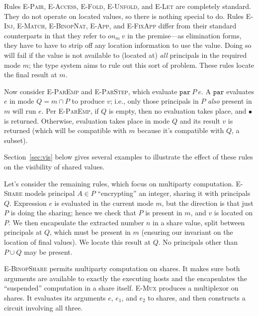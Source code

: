 \documentclass[10pt]{article}
\newcommand{\rulelab}[1]{{\small \textsc{#1}}}
\newcommand{\kw}[1]{\ensuremath{\mathtt{#1}}}
\newcommand{\epar}[2]{\ensuremath{\kw{par}~{#1}~{#2}}}
\newcommand{\vcrash}{\ensuremath{\bullet}}
\newcommand{\getat}[2]{\ensuremath{\mathit{on}_{#1}~{#2}}}
\begin{document}
Rules \rulelab{E-Pair}, \rulelab{E-Access}, \rulelab{E-Fold},
\rulelab{E-Unfold}, and \rulelab{E-Let} are completely standard. They
do not operate on located values, so there is nothing special to do.
Rules \rulelab{E-Inj}, \rulelab{E-Match}, \rulelab{E-BinopNat},
\rulelab{E-App}, and \rulelab{E-FixApp} differ from their standard
counterparts in that they refer to $\getat{m}{v}$ in the premise---as
elimination forms, they have to have to strip off any location
information to use the value. Doing so will fail if the value is
not available to (located at) \emph{all} principals in the required
mode $m$; the type system aims to rule out this sort of problem. These
rules locate the final result at $m$.

Now consider \rulelab{E-ParEmp} and \rulelab{E-ParStep}, which
evaluate $\epar{P}{e}$. A $\kw{par}$ evaluates $e$ in mode
$Q = m \cap P$ to produce $v$; i.e., only those principals in $P$
\emph{also} present in $m$ will run $e$. Per \rulelab{E-ParEmp}, if
$Q$ is empty, then no evaluation takes place, and $\vcrash$ is
returned. %
Otherwise, evaluation
takes place in mode $Q$ and its result $v$ is returned (which will be
compatible with $m$ because it's compatible with $Q$, a subset).

Section~\ref{sec:vis} below gives several examples to illustrate the
effect of these rules on the visibility of shared values.

Let's consider the remaining rules, which focus on multiparty
computation. \rulelab{E-Share} models principal $A \in P$
``encrypting'' an integer, sharing it with principals $Q$. Expression
$e$ is evaluated in the current mode $m$, but the direction is that
just $P$ is doing the sharing; hence we check that $P$ is present in
$m$, and $v$ is located
on $P$. We then encapsulate the extracted number $n$ in a share value,
split between principals at $Q$, which must be present in $m$
(ensuring our invariant on the location of final values). We locate
this result at $Q$. No principals other than $P \cup Q$ may be
present. 

\rulelab{E-BinopShare} permits multiparty computation on shares. It
makes sure both arguments are available to exactly the executing hosts
and the encapsulates the ``suspended'' computation in a share
itself. \rulelab{E-Mux} produces a multiplexor on shares. It evaluates
its arguments $e$, $e_1$, and $e_2$ to shares, and then constructs a
circuit involving all three.
\end{document}
